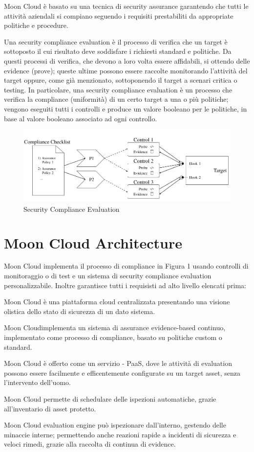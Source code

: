 Moon Cloud è basato su una tecnica di security assurance garantendo che tutti le attività aziendali si compiano
seguendo i requisiti prestabiliti da appropriate politiche e procedure.

Una security compliance evaluation è il processo di verifica che un target è sottoposto il cui risultato deve 
soddisfare i richiesti standard e politiche. Da questi processi di verifica, che devono a loro volta essere 
affidabili, si ottendo delle evidence (prove); queste ultime possono essere raccolte monitorando l'attività
del target oppure, come già menzionato, sottoponendo il target a scenari
critica o testing.
In particolare, una security compliance evaluation è un processo che verifica la compliance (uniformità)
di un certo target a una o più politiche; vengono eseguiti tutti i controlli e produce un valore booleano per
le politiche, in base al valore booleano associato ad ogni controllo.
\begin{figure}
	\includegraphics[scale=0.5]{images/Security_Compliance_Evaluation.PNG}
	\caption{Security Compliance Evaluation}
\end{figure}

\section{Moon Cloud Architecture}
Moon Cloud implementa il processo di compliance in Figura 1 usando controlli di monitoraggio o di test e un sistema
di security compliance evaluation personalizzabile. Inoltre garantisce tutti i requisisti ad alto livello 
elencati prima:
\begin{description}
	\item Moon Cloud è una piattaforma cloud centralizzata presentando una visione olistica dello stato di 
	sicurezza di un dato sistema.
	\item Moon Cloudimplementa un sistema di assurance evidence-based continuo, implementato come processo di compliance,
	basato su politiche custom o standard.
	\item Moon Cloud è offerto come un servizio - PaaS, dove le attività di evaluation possono essere facilmente 
	e efficentemente configurate su un target asset, senza l'intervento dell'uomo.
	\item Moon Cloud permette di schedulare delle ispezioni automatiche, grazie all'inventario di asset protetto.
	\item Moon Cloud evaluation engine può ispezionare dall'interno, gestendo delle minaccie interne; permettendo 
	anche reazioni rapide a incidenti di sicurezza e veloci rimedi, grazie alla raccolta di continua di evidence. 
\end{description}


